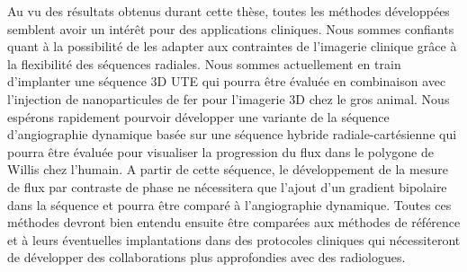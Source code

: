 Au vu des résultats obtenus durant cette thèse, toutes les méthodes développées semblent avoir un intérêt pour des applications cliniques. Nous sommes confiants quant à la possibilité de les adapter aux contraintes de l'imagerie clinique grâce à la flexibilité des séquences radiales. 
Nous sommes actuellement en train d'implanter une séquence 3D UTE qui pourra être évaluée en combinaison avec l'injection de nanoparticules de fer pour l'imagerie 3D chez le gros animal. Nous espérons rapidement pourvoir développer une variante de la séquence d'angiographie dynamique basée sur une séquence hybride radiale-cartésienne qui pourra être évaluée pour visualiser la progression du flux dans le polygone de Willis chez l'humain. A partir de cette séquence, le développement de la mesure de flux par contraste de phase ne nécessitera que l'ajout d'un gradient bipolaire dans la séquence et pourra être comparé à l'angiographie dynamique.
Toutes ces méthodes devront bien entendu ensuite être comparées aux méthodes de référence et à leurs éventuelles implantations dans des protocoles cliniques qui nécessiteront de développer des collaborations plus approfondies avec des radiologues.
